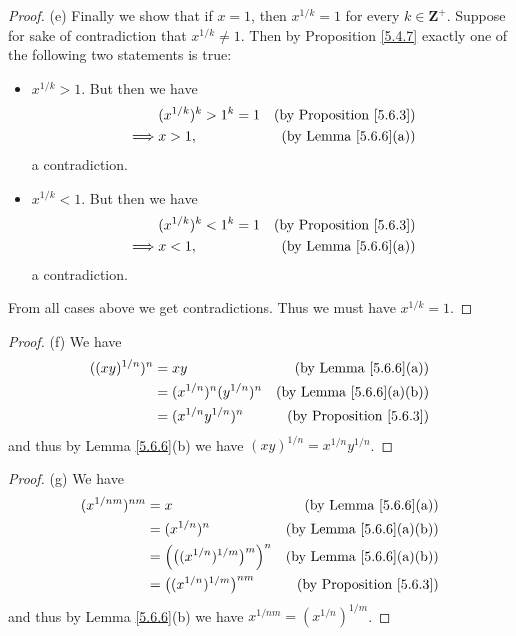 \begin{proof}{(e)}
    Finally we show that if \(x = 1\), then \(x^{1 / k} = 1\) for every \(k \in \mathbf{Z}^+\).
    Suppose for sake of contradiction that \(x^{1 / k} \neq 1\).
    Then by Proposition \ref{5.4.7} exactly one of the following two statements is true:
    \begin{itemize}
        \item \(x^{1 / k} > 1\).
              But then we have
              \begin{align*}
                           & (x^{1 / k})^k > 1^k = 1 & \text{(by Proposition \ref{5.6.3})} \\
                  \implies & x > 1,                  & \text{(by Lemma \ref{5.6.6}(a))}
              \end{align*}
              a contradiction.
        \item \(x^{1 / k} < 1\).
              But then we have
              \begin{align*}
                           & (x^{1 / k})^k < 1^k = 1 & \text{(by Proposition \ref{5.6.3})} \\
                  \implies & x < 1,                  & \text{(by Lemma \ref{5.6.6}(a))}
              \end{align*}
              a contradiction.
    \end{itemize}
    From all cases above we get contradictions.
    Thus we must have \(x^{1 / k} = 1\).
\end{proof}

\begin{proof}{(f)}
    We have
    \begin{align*}
        ((xy)^{1 / n})^n & = xy                          & \text{(by Lemma \ref{5.6.6}(a))}    \\
                         & = (x^{1 / n})^n (y^{1 / n})^n & \text{(by Lemma \ref{5.6.6}(a)(b))} \\
                         & = (x^{1 / n} y^{1 / n})^n     & \text{(by Proposition \ref{5.6.3})}
    \end{align*}
    and thus by Lemma \ref{5.6.6}(b) we have \((xy)^{1 / n} = x^{1 / n} y^{1 / n}\).
\end{proof}

\begin{proof}{(g)}
    We have
    \begin{align*}
        (x^{1 / nm})^{nm} & = x                                           & \text{(by Lemma \ref{5.6.6}(a))}    \\
                          & = (x^{1 / n})^n                               & \text{(by Lemma \ref{5.6.6}(a)(b))} \\
                          & = \Big(\big((x^{1 / n})^{1 / m}\big)^m\Big)^n & \text{(by Lemma \ref{5.6.6}(a)(b))} \\
                          & = \big((x^{1 / n})^{1 / m}\big)^{nm}          & \text{(by Proposition \ref{5.6.3})}
    \end{align*}
    and thus by Lemma \ref{5.6.6}(b) we have \(x^{1 / nm} = (x^{1 / n})^{1 / m}\).
\end{proof}

